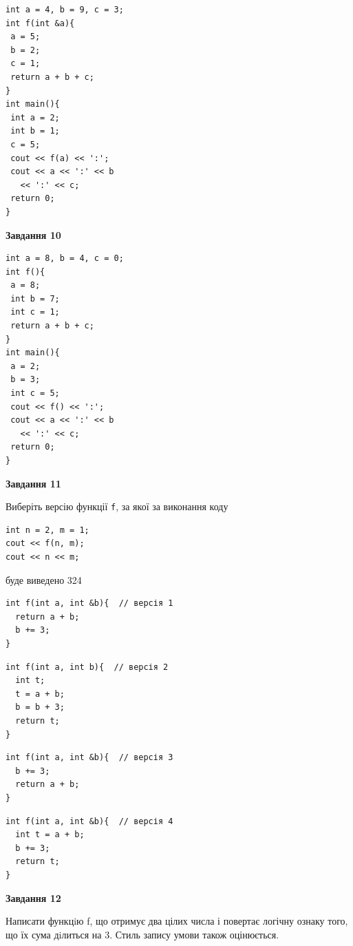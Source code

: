 \documentclass[12pt, ukrainian]{article}
\def\code#1{\Verb!#1!}
\begin{document}
{\begin {large}
\begin{minipage}[t]{7.0cm}
\begin{verbatim}
int a = 4, b = 9, c = 3;
int f(int &a){
 a = 5;
 b = 2;
 c = 1;
 return a + b + c;
}
int main(){
 int a = 2;
 int b = 1;
 c = 5;
 cout << f(a) << ':';
 cout << a << ':' << b 
   << ':' << c;
 return 0;
}
\end{verbatim}



\begin{center}
\textbf{Завдання 10}
\end{center}
\vspace{-8mm}

\begin{verbatim}
int a = 8, b = 4, c = 0;
int f(){
 a = 8;
 int b = 7;
 int c = 1;
 return a + b + c;
}
int main(){
 a = 2;
 b = 3;
 int c = 5;
 cout << f() << ':';
 cout << a << ':' << b 
   << ':' << c;
 return 0;
}
\end{verbatim}

\end{minipage}
\vline \hspace{1mm}
\begin{minipage}[t]{11.0cm}

\begin{center}
\textbf{Завдання 11}
\end{center}
Виберіть версію функції \code{f}, за якої за виконання коду
\begin{verbatim}
int n = 2, m = 1;
cout << f(n, m);
cout << n << m;
\end{verbatim}

буде виведено 324

\begin{verbatim}
int f(int a, int &b){  // версія 1
  return a + b;
  b += 3;
}
\end{verbatim}

\vspace{-8mm}\begin{verbatim}
int f(int a, int b){  // версія 2
  int t;
  t = a + b;
  b = b + 3;
  return t;
}
\end{verbatim}

\vspace{-8mm}\begin{verbatim}
int f(int a, int &b){  // версія 3
  b += 3;
  return a + b;
}
\end{verbatim}

\vspace{-8mm}\begin{verbatim}
int f(int a, int &b){  // версія 4
  int t = a + b;
  b += 3;
  return t;
}
\end{verbatim}



\begin{center}
\textbf{Завдання 12}
\end{center}

Написати функцiю f, що отримує два цілих числа і повертає логічну ознаку того, що їх сума дiлиться на 3. Стиль запису умови також оцінюється.\par

\end{minipage}

\end {large}}
\newpage

\end{document}
